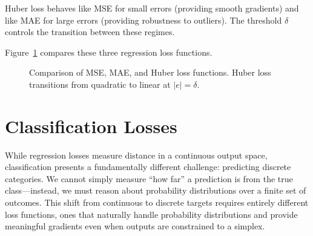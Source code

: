 \documentclass[../../main.tex]{subfiles}
\begin{document}
\begin{intuition}
Huber loss behaves like MSE for small errors (providing smooth gradients) and like MAE for large errors (providing robustness to outliers). The threshold $\delta$ controls the transition between these regimes.
\end{intuition}

Figure~\ref{fig:regression-losses} compares these three regression loss functions.

\begin{figure}[htbp]
\centering
{}
\caption{Comparison of MSE, MAE, and Huber loss functions. Huber loss transitions from quadratic to linear at $|e| = \delta$.}
\label{fig:regression-losses}
\end{figure}

\section{Classification Losses}
\label{sec:classification-losses}

While regression losses measure distance in a continuous output space, classification presents a fundamentally different challenge: predicting discrete categories. We cannot simply measure ``how far'' a prediction is from the true class---instead, we must reason about probability distributions over a finite set of outcomes. This shift from continuous to discrete targets requires entirely different loss functions, ones that naturally handle probability distributions and provide meaningful gradients even when outputs are constrained to a simplex.
\end{document}
